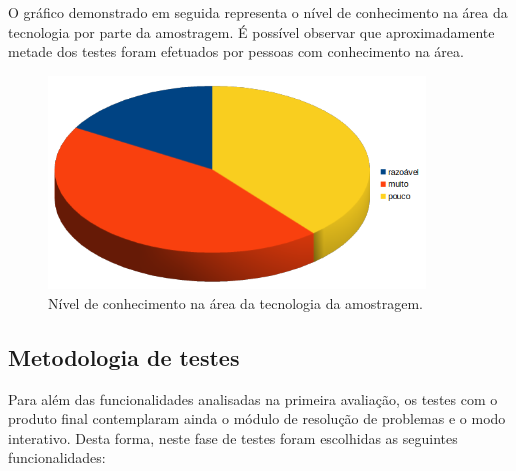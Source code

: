 \documentclass[11pt, a4paper]{article}
\begin{document}
O gráfico demonstrado em seguida representa o nível de conhecimento na área da tecnologia por parte da amostragem. É possível observar que aproximadamente metade dos testes foram efetuados por pessoas com conhecimento na área. 

    \begin{figure}[H]
        \centering
        \includegraphics[width=10cm]{images/guiaoR/conhecimento_2.png}
        \caption{Nível de conhecimento na área da tecnologia da amostragem.}
    \end{figure}

\subsection{Metodologia de testes}

Para além das funcionalidades analisadas na primeira avaliação, os testes com o produto final contemplaram ainda o módulo de resolução de problemas e o modo interativo. Desta forma, neste fase de testes foram escolhidas as seguintes funcionalidades:
\end{document}
